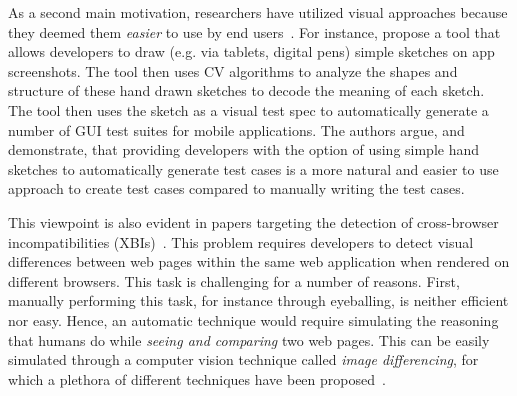 As a second main motivation, researchers have utilized visual approaches
because they deemed them \emph{easier} to use by end users~\cite{Choudhary-2012-ICST,
Semenenko-2013-ICSM,Choudhary-2013-ICSE,Mahajan-2014-ASE,Zhang-2017-ASE,
Choudhary-2010-ICSM,Lin-2014-TSE,Amalfitano-2014-WISE,Selay-2014-DICTA,
Mahajan-2015-ICST,Mahajan-2016-ICST,He-2016-ICWS,Chen-2017-IUI,
Xu-2018-TOIT,Delamaro-2011-STVR,Kuchta-2018-EMSE}. 
%
For instance, \citet{Zhang-2017-ASE} propose a tool that allows developers
to draw (e.g. via tablets, digital pens) simple sketches on app screenshots.
The tool then uses CV algorithms to analyze the shapes and structure of these hand
drawn sketches to decode the meaning of each sketch.
The tool then uses the sketch as a visual test spec to automatically
generate a number of GUI test suites for mobile applications.
The authors argue, and demonstrate, that providing developers with the option
of using simple hand sketches to automatically generate test cases
is a more natural and easier to use approach to create test cases compared to manually writing the test cases.


\begin{figure}
\end{figure}

This viewpoint is also evident in papers targeting the detection of cross-browser
incompatibilities (XBIs)~\cite{Choudhary-2010-ICSM, Choudhary-2012-ICST, Semenenko-2013-ICSM,
Choudhary-2013-ICSE, Selay-2014-DICTA, He-2016-ICWS, Xu-2018-TOIT}.
This problem requires developers to detect visual differences between web pages within the same web application when rendered on different browsers.
This task is challenging for a number of reasons. 
First, manually performing this task, for instance through eyeballing, is neither efficient nor easy.
Hence, an automatic technique would require simulating
the reasoning that humans do while \textit{seeing and comparing} two web pages.
This can be easily simulated through a computer vision technique called \textit{image differencing}, for which a plethora of different techniques have been proposed~\cite{Choudhary-2012-ICST,
	Semenenko-2013-ICSM,Choudhary-2013-ICSE}.

